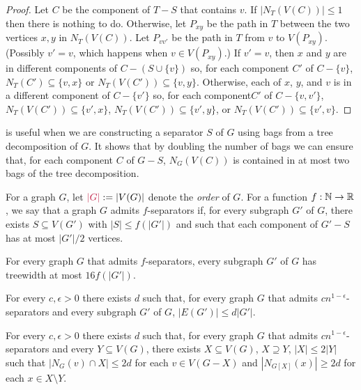 \documentclass{patmorin}
\makeatletter
\renewcommand{\ge}{\geqslant}
\renewcommand{\le}{\leqslant}
\newcommand{\defin}[1]{\emph{\textcolor{brightmaroon}{#1}}}
\def\mathcolor#1#{\@mathcolor{#1}}
\def\@mathcolor#1#2#3{%
  \protect\leavevmode
  \begingroup
    \color#1{#2}#3%
  \endgroup
}
\newcommand{\mathdefin}[1]{\mathcolor{brightmaroon}{#1}}
\makeatother
\begin{document}
\begin{proof}
  Let $C$ be the component of $T-S$ that contains $v$. If $|N_T(V(C))|\le 1$ then there is nothing to do.  Otherwise, let $P_{xy}$ be the path in $T$ between the two vertices $x,y$ in $N_T(V(C))$.  Let $P_{vv'}$ be the path in $T$ from $v$ to $V(P_{xy})$.  (Possibly $v'=v$, which happens when $v\in V(P_{xy})$.)  If $v'=v$, then $x$ and $y$ are in different components of $C-(S\cup\{v\})$ so, for each component $C'$ of $C-\{v\}$, $N_T(C')\subseteq\{v,x\}$ or $N_T(V(C'))\subseteq\{v,y\}$.  Otherwise, each of $x$, $y$, and $v$ is in a different component of $C-\{v'\}$ so, for each component$C'$ of $C-\{v,v'\}$, $N_T(V(C'))\subseteq\{v',x\}$, $N_T(V(C'))\subseteq\{v',y\}$, or $N_T(V(C'))\subseteq\{v',v\}$.
\end{proof}

 is useful when we are constructing a separator $S$ of $G$ using bags from a tree decomposition of $G$.  It shows that by doubling the number of bags we can ensure that, for each component $C$ of $G-S$, $N_G(V(C))$ is contained in at most two bags of the tree decomposition.





For a graph $G$, let $\mathdefin{|G|}:=|V(G)|$ denote the \defin{order} of $G$.  For a function $f:\mathbb{N}\to\mathbb{R}$, we say that a graph $G$ admits $f$-separators if, for every subgraph $G'$ of $G$, there exists $S\subseteq V(G')$ with $|S|\le f(|G'|)$ and such that each component of $G'-S$ has at most $|G'|/2$ vertices.

\begin{thm}\label{dvorak_norin}
  For every graph $G$ that admits $f$-separators, every subgraph $G'$ of $G$ has treewidth at most $16f(|G'|)$.
\end{thm}

\begin{thm}[??]\label{density_bound}
  For every $c,\epsilon >0$ there exists $d$ such that, for every graph $G$ that admits $cn^{1-\epsilon}$-separators and every subgraph $G'$ of $G$, $|E(G')|\le d|G'|$.
\end{thm}

\begin{lem}\label{degree_bounder}
  For every $c,\epsilon >0$ there exists $d$ such that, for every graph $G$ that admits $cn^{1-\epsilon}$-separators and every $Y\subseteq V(G)$, there exists $X\subseteq V(G)$, $X\supseteq Y$, $|X|\le 2|Y|$ such that $|N_G(v)\cap X|\le 2d$ for each $v\in V(G-X)$ and $|N_{G[X]}(x)|\ge 2d$ for each $x\in X\setminus Y$.
\end{lem}
\end{document}
